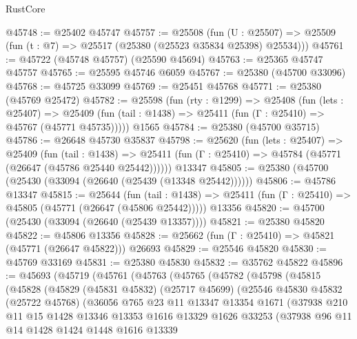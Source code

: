 \begin{lexlean}{RustCore}
\begin{coremodule}
@45748 := @25402 @45747
@45757 := @25508
    (fun (U : @25507) => @25509 (fun (t : @7) => @25517 (@25380 (@25523 @35834 @25398) @25534)))
@45761 := @45722 (@45748 @45757) (@25590 @45694)
@45763 := @25365 @45747 @45757
@45765 := @25595 @45746 @6059
@45767 := @25380 (@45700 @33096)
@45768 := @45725 @33099
@45769 := @25451 @45768
@45771 := @25380 (@45769 @25472)
@45782 := @25598
    (fun (rty : @1299) =>
    @25408
      (fun (lets : @25407) =>
      @25409 (fun (tail : @1438) => @25411 (fun (Γ : @25410) => @45767 (@45771 @45735)))))
    @1565
@45784 := @25380 (@45700 @35715)
@45786 := @26648 @45730 @35837
@45798 := @25620
    (fun (lets : @25407) =>
    @25409
      (fun (tail : @1438) =>
      @25411 (fun (Γ : @25410) => @45784 (@45771 (@26647 (@45786 @25440 @25442))))))
    @13347
@45805 := @25380 (@45700 (@25430 (@33094 (@26640 (@25439 (@13348 @25442))))))
@45806 := @45786 @13347
@45815 := @25644
    (fun (tail : @1438) => @25411 (fun (Γ : @25410) => @45805 (@45771 (@26647 (@45806 @25442)))))
    @13356
@45820 := @45700 (@25430 (@33094 (@26640 (@25439 @13357))))
@45821 := @25380 @45820
@45822 := @45806 @13356
@45828 := @25662 (fun (Γ : @25410) => @45821 (@45771 (@26647 @45822))) @26693
@45829 := @25546 @45820
@45830 := @45769 @33169
@45831 := @25380 @45830
@45832 := @35762 @45822
@45896 := @45693
    (@45719
      (@45761
        (@45763
          (@45765
            (@45782
              (@45798
                (@45815
                  (@45828
                    (@45829
                      (@45831 @45832)
                      (@25717 @45699)
                      (@25546
                        @45830
                        @45832
                        (@25722 @45768)
                        (@36056
                          @765
                          @23
                          @11
                          @13347
                          @13354
                          @1671
                          (@37938
                            @210
                            @11
                            @15
                            @1428
                            @13346
                            @13353
                            @1616
                            @13329
                            @1626
                            @33253
                            (@37938
                              @96
                              @11
                              @14
                              @1428
                              @1424
                              @1448
                              @1616
                              @13339

\end{coremodule}
\end{lexlean}
